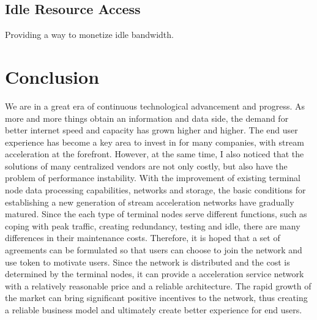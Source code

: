 \documentclass[12pt, a4paper, unicode]{report}
\begin{document}
    
    \section{Idle Resource Access}
    Providing a way to monetize idle bandwidth.

    
    \chapter{Conclusion}
    We are in a great era of continuous technological advancement and progress. As more and more things obtain an information and data side, the demand for better internet speed and capacity has grown higher and higher. The end user experience has become a key area to invest in for many companies, with stream acceleration at the forefront. However, at the same time, I also noticed that the solutions of many centralized vendors are not only costly, but also have the problem of performance instability. With the improvement of existing terminal node data processing capabilities, networks and storage, the basic conditions for establishing a new generation of stream acceleration networks have gradually matured. Since the each type of terminal nodes serve different functions, such as coping with peak traffic, creating redundancy, testing and idle, there are many differences in their maintenance costs. Therefore, it is hoped that a set of agreements can be formulated so that users can choose to join the network and use token to motivate users. Since the network is distributed and the cost is determined by the terminal nodes, it can provide a acceleration service network with a relatively reasonable price and a reliable architecture. The rapid growth of the market can bring significant positive incentives to the network, thus creating a reliable business model and ultimately create better experience for end users.








\stopcontents[tocpart1] %
\end{document}
